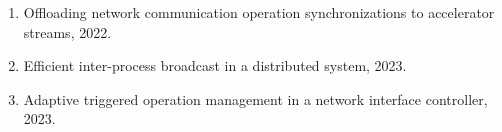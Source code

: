 \begin{enumerate}
\setcounter{enumi}{0}
\item Offloading network communication operation synchronizations to accelerator
      streams, 2022.
\item Efficient inter-process broadcast in a distributed system, 2023.
\item Adaptive triggered operation management in a network interface controller,
      2023.
\end{enumerate}
